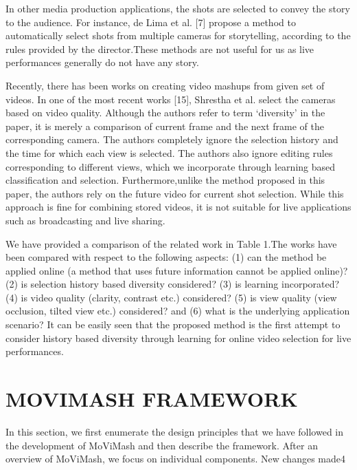\documentclass{sig-alternate}
\begin{document}
In other media production applications, the shots are selected to convey the story to the audience. For instance, de Lima et al. [7] propose a method to automatically select shots from multiple cameras for storytelling, according to the rules provided by the director.These methods are not useful for us as live performances generally do not have any story.

Recently, there has been works on creating video mashups from given set of videos. In one of the most recent works [15], Shrestha et al. select the cameras based on video quality. Although the authors refer to term ‘diversity’ in the paper, it is merely a comparison of current frame and the next frame of the corresponding camera. The authors completely ignore the selection history and the time for which each view is selected. The authors also ignore editing rules corresponding to different views, which we incorporate through learning based classification and selection. Furthermore,unlike the method proposed in this paper, the authors rely on the future video for current shot selection. While this approach is fine for combining stored videos, it is not suitable for live applications such as broadcasting and live sharing.

We have provided a comparison of the related work in Table 1.The works have been compared with respect to the following aspects: (1) can the method be applied online (a method that uses future information cannot be applied online)? (2) is selection history based diversity considered? (3) is learning incorporated? (4) is video quality (clarity, contrast etc.) considered? (5) is view quality (view occlusion, tilted view etc.) considered? and (6) what is the underlying application scenario? It can be easily seen that the proposed method is the first attempt to consider history based diversity through learning for online video selection for live performances.

\section{MOVIMASH FRAMEWORK}
In this section, we first enumerate the design principles that we have followed in the development of MoViMash and then describe the framework. After an overview of MoViMash, we focus on individual components.
New changes made4
\end{document}
